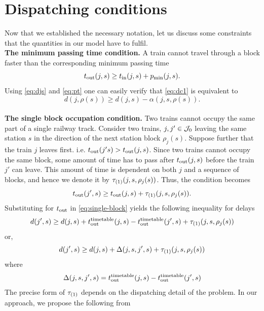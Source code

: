 \section{Dispatching conditions}
Now that we established the necessary notation, let us discuss some constraints that the quantities
in our model have to fulfil.\\
\textbf{The minimum passing time condition.} A train cannot travel through a block faster than the corresponding minimum passing time
\begin{equation}
	\label{eq:dc1}
	t_\text{out}(j, s) \ge t_\text{in}(j, s) + p_\text{min}(j, s).
\end{equation}
Using \eqref{eq:djs} and \eqref{eq:pt} one can easily verify that \eqref{eq:dc1} is equivalent to
\begin{equation}
	d(j, \rho(s)) \ge d(j, s) - \alpha(j, s, \rho(s)).
\end{equation}\\
\textbf{The single block occupation condition.} Two trains cannot occupy the same part of a single
railway track. Consider two trains, $j, j' \in \mathcal{J}_0$ leaving the same station $s$ in the direction
of the next station block $\rho_j(s)$. Suppose further that the train $j$ leaves first. i.e.
$t_\text{out}(j's) > t_\text{out}(j, s)$. Since two trains cannot occupy the same block, some amount of time has
to pass after $t_\text{out}(j, s)$ before the train $j'$ can leave. This amount of time is dependent on
both $j$ and a sequence of blocks, and hence we denote it by $\tau_{(1)}(j, s, \rho_j(s))$. Thus, the
condition becomes
\begin{equation}
	\label{eq:single-block}
	t_\text{out}(j', s) \ge t_\text{out}(j, s) + \tau_{(1)}(j, s, \rho_j(s)).
\end{equation}
Substituting for $t_\text{out}$ in \eqref{eq:single-block} yields the following inequality for delays
\begin{equation}
	\label{eq:single-block-delays}
	d(j', s) \ge d(j, s) + t_\text{out}^\text{timetable}(j, s) - t_\text{out}^\text{timetable}(j', s) + \tau_{(1)}(j, s, \rho_j(s))
\end{equation}
or,
\begin{equation}
	d(j', s) \ge d(j, s) + \Delta(j, s, j', s) + \tau_{(1)}(j, s, \rho_j(s))
\end{equation}
where
\begin{equation}
	\label{eq:delta}
	\Delta(j, s, j', s) = t_\text{out}^\text{timetable}(j, s) - t_\text{out}^\text{timetable}(j', s)
\end{equation}
The precise form of $\tau_{(1)}$ depends on the dispatching detail of the problem. In our approach, we
propose the following from
